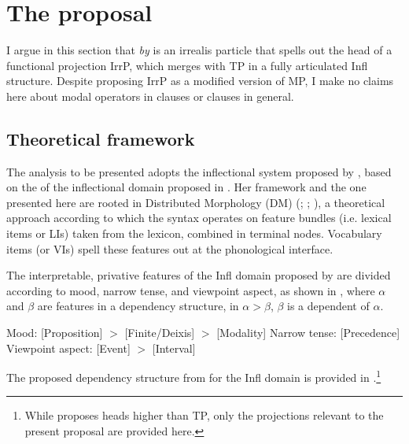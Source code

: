 \documentclass[output=paper,modfonts,newtxmath,hidelinks,]{langscibook}
\begin{document}
\section{The proposal}\label{10:s4}

I argue in this section that \textit{by} is an irrealis particle that spells out the head of a functional projection IrrP, which merges with TP in a fully articulated Infl structure. Despite proposing IrrP as a modified version of  MP, I make no claims here about modal operators in   clauses or  clauses in general. 

\subsection{Theoretical framework}\label{10:s4.1}

The analysis to be presented adopts the inflectional system proposed by \citet{Cowper2010}, based on the  of the inflectional domain proposed in \citet{Cowper2005}. Her framework and the one presented here are rooted in Distributed Morphology (DM) (\citealt{HalleMarantz1993}; \citealt{EmbickNoyer2007}; \citealt{Bobaljik}), a theoretical approach according to which the syntax operates on feature bundles (i.e. lexical items or LIs) taken from the lexicon, combined in terminal nodes. Vocabulary items (or VIs) spell these features out at the phonological interface. 

The interpretable, privative features of the Infl domain proposed by \citet{Cowper2005} are divided according to mood, narrow tense, and viewpoint aspect, as shown in , where $\alpha$ and $\beta$ are features in a dependency structure, in $\alpha >\beta$, $\beta$ is a dependent of $\alpha$.\largerpage[2]

\ea \label{10:ex22}
Mood: [Proposition] $>$ [Finite/Deixis] $>$ [Modality]
\newline Narrow tense: [Precedence]
\newline Viewpoint aspect: [Event] $>$ [Interval] \hfill \citep[1]{Cowper2010}
\z


\noindent The proposed dependency structure from \citet{Cowper2010} for the  Infl domain is provided in .\footnote{\label{10:fn1}While \citet{Cowper2010} proposes heads higher than TP, only the projections relevant to the present proposal are provided here.}
\end{document}
